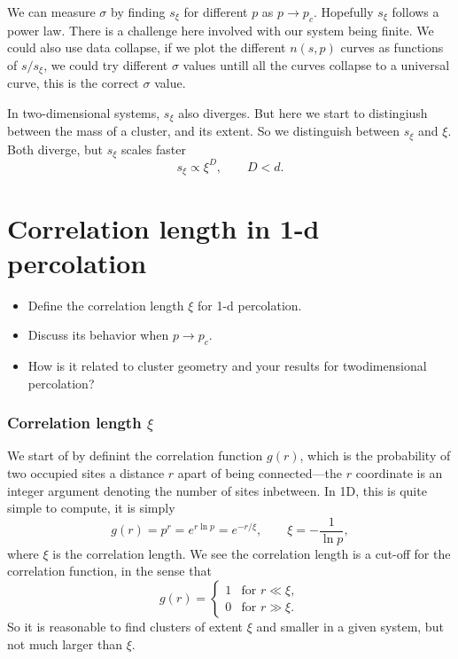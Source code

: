 \documentclass[a4paper, 11pt, notitlepage, english]{article}
\begin{document}
We can measure $\sigma$ by finding $s_\xi$ for different $p$ as $p \to p_c$. Hopefully $s_\xi$ follows a power law. There is a challenge here involved with our system being finite. We could also use data collapse, if we plot the different $n(s,p)$ curves as functions of $s/s_\xi$, we could try different $\sigma$ values untill all the curves collapse to a universal curve, this is the correct $\sigma$ value.

In two-dimensional systems, $s_\xi$ also diverges. But here we start to distingiush between the mass of a cluster, and its extent. So we distinguish between $s_\xi$ and $\xi$. Both diverge, but $s_\xi$ scales faster
$$s_\xi \propto \xi^{D}, \qquad D < d.$$ 

\clearpage


\section{Correlation length in 1-d percolation}
\begin{itemize}
	\item Define the correlation length $\xi$ for 1-d percolation.
	\item Discuss its behavior when $p \to p_c$. 
	\item How is it related to cluster geometry and your results for twodimensional percolation?	
\end{itemize}

\subsubsection*{Correlation length $\xi$}

We start of by definint the correlation function $g(r)$, which is the probability of two occupied sites a distance $r$ apart of being connected---the $r$ coordinate is an integer argument denoting the number of sites inbetween. In 1D, this is quite simple to compute, it is simply
$$g(r) = p^r = e^{r \ln p} = e^{-r/\xi}, \qquad \xi = -\frac{1}{\ln p},$$
where $\xi$ is the correlation length. We see the correlation length is a cut-off for the correlation function, in the sense that
$$g(r) = \begin{cases}
	1 & \mbox{for } r \ll \xi, \\
	0 & \mbox{for } r \gg \xi.
\end{cases}$$
So it is reasonable to find clusters of extent $\xi$ and smaller in a given system, but not much larger than $\xi$.
\end{document}

